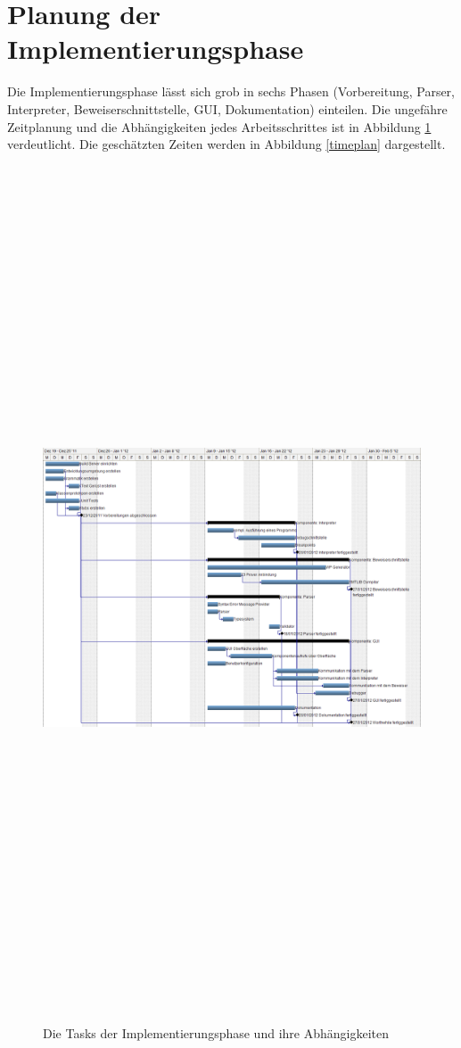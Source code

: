 \section{Planung der Implementierungsphase}

Die Implementierungsphase lässt sich grob in sechs Phasen (Vorbereitung, Parser, Interpreter, Beweiserschnittstelle, GUI, Dokumentation) einteilen. Die ungefähre Zeitplanung und die Abhängigkeiten jedes Arbeitsschrittes ist in Abbildung \ref{gantt_impl} verdeutlicht. Die geschätzten Zeiten werden in Abbildung \ref{timeplan} dargestellt.

\begin{figure}
	\centering
	\hspace*{-2cm}\vspace*{-2cm}\caption[B]{Die Tasks der Implementierungsphase und ihre Abhängigkeiten}
	\hspace*{-3cm}\vspace*{-3cm}\includegraphics[angle=90,width=19cm,height= 25cm]{diagrams/gantt_implementierung_diag.png}
	\label{gantt_impl}
\end{figure}

